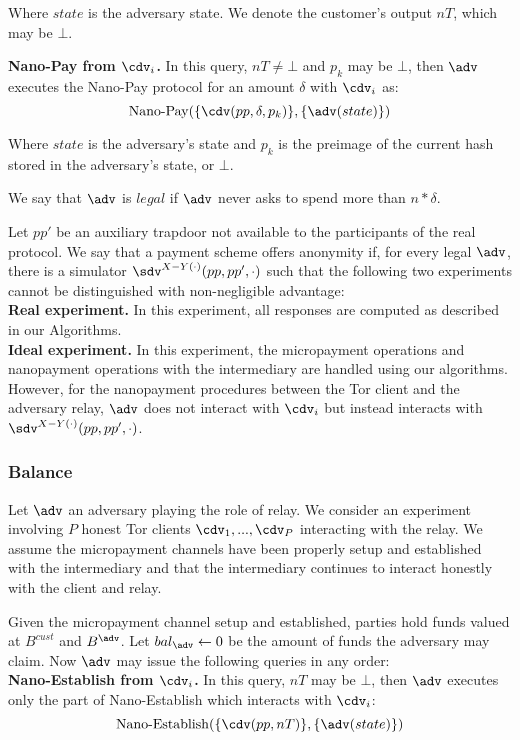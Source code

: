 Where $state$ is the adversary state. We denote the customer's output $nT$,
which may be $\bot$.


\textbf{Nano-Pay from $\cdv_i$.} In this query, $nT \neq \bot$ and $p_k$ may be
$\bot$, then $\adv$ executes the Nano-Pay protocol for an amount $\delta$ with
$\cdv_i$ as:
$$\operatorname{Nano-Pay}(\{\cdv(pp, \delta, p_k)\}, \{\adv(state)\})$$

Where $state$ is the adversary's state and $p_k$ is the preimage of the current
hash stored in the adversary's state, or $\bot$.

We say that $\adv$ is $legal$ if $\adv$ never asks to spend more than
$n*\delta$.

Let $pp'$ be an auxiliary trapdoor not available to the participants of the real
protocol. We say that a payment scheme offers anonymity if, for every legal
$\adv$, there is a simulator $\sdv^{X-Y(\cdot)}(pp, pp', \cdot)$ such that the
following two experiments cannot be distinguished with non-negligible
advantage:\\ \textbf{Real experiment.} In this experiment, all responses are
computed as described in our Algorithms.\\ \textbf{Ideal experiment.} In this
experiment, the micropayment operations and nanopayment operations with the
intermediary are handled using our algorithms. However, for the nanopayment
procedures between the Tor client and the adversary relay, $\adv$ does not
interact with $\cdv_i$ but instead interacts with
$\sdv^{X-Y(\cdot)}(pp,pp',\cdot)$.

\subsubsection{Balance}
\label{def:balance}

Let $\adv$ an adversary playing the role of relay. We consider an experiment
involving $P$ honest Tor clients $\cdv_1,..., \cdv_P$ interacting with the
relay. We assume the micropayment channels have been properly setup and
established with the intermediary and that the intermediary continues to
interact honestly with the client and relay.

Given the micropayment channel setup and established, parties hold funds valued
at $B^{cust}$ and $B^{\adv}$. Let $bal_\adv \leftarrow 0$ be the amount of funds
the adversary may claim. Now $\adv$ may issue the following queries in any
order:\\

\textbf{Nano-Establish from $\cdv_i$.} In this query, $nT$ may be $\bot$, then
$\adv$ executes only the part of Nano-Establish which interacts with $\cdv_i$:
$$\operatorname{Nano-Establish}(\{\cdv(pp, nT)\}, \{\adv(state)\})$$

